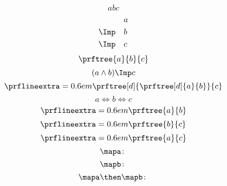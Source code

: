 {\begin{forslides}
\begin{equation}
{                {a}
                {b}}
            {c}
        \end{equation}
        \begin{equation}
            \label{eq:abc_2}
            \begin{aligned}
                           & a \\
                \Imp \quad & b \\
                \Imp \quad & c
            \end{aligned}
        \end{equation}
        \begin{equation}
            \label{eq:abc_3}
            \prftree{a}{b}{c}
        \end{equation}
        \begin{equation}
            \label{eq:abc_4}
            (a\wedge b)\Imp c
        \end{equation}
        \begin{equation}
            \label{eq:abc_5}
            \prflineextra=0.6em
            \prftree[d]
            {\prftree[d]
                {a}
                {b}}
            {c}
        \end{equation}
        \begin{equation}
            \label{eq:abc_6}
            a\Leftrightarrow b \Leftrightarrow c
        \end{equation}
        \begin{equation}
            \label{eq:abc_7}
            \prflineextra=0.6em
            \prftree{a}{b}
        \end{equation}
        \begin{equation}
            \label{eq:abc_8}
            \prflineextra=0.6em
            \prftree{b}{c}
        \end{equation}
        \begin{equation}
            \label{eq:abc_9}
            \prflineextra=0.6em
            \prftree{a}{c}
        \end{equation}
        \begin{equation}
            \label{eq:mapf}
            \mapa \colon
        \end{equation}
        \begin{equation}
            \label{eq:mapg}
            \mapb \colon
        \end{equation}
        \begin{equation}
            \label{eq:mapcomp}
            \mapa \then \mapb \colon

\end{equation}
\end{forslides}}
